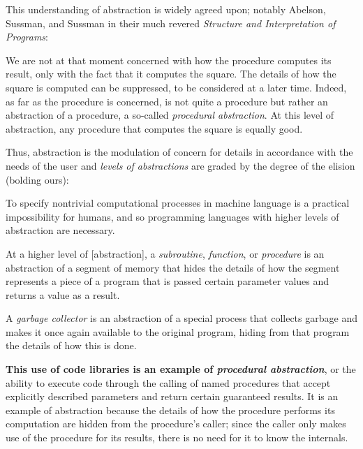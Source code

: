 This understanding of abstraction is widely agreed upon;
notably Abelson, Sussman, and Sussman in their much revered \textit{Structure and Interpretation of Programs}:
\begin{displayquote}
    We are not at that moment concerned with how the procedure computes its result, only with the fact that it computes the square.
    The details of how the square is computed can be suppressed, to be considered at a later time.
    Indeed, as far as the  procedure is concerned,  is not quite a procedure but rather an abstraction of a procedure, a so-called \textit{procedural abstraction}.
    At this level of abstraction, any procedure that computes the square is equally good.
\end{displayquote}

Thus, abstraction is the modulation of concern for details in accordance with the needs of the user and \textit{levels of abstractions} are graded by the degree of the elision (bolding ours):
\begin{displayquote}
    To specify nontrivial computational processes in machine language is a practical impossibility for humans, and so programming languages with higher levels of abstraction are necessary.

    \vspace{4pt}

    \textellipsis At a higher level of [abstraction], a \textit{subroutine}, \textit{function}, or \textit{procedure} is an abstraction of a segment of memory that hides the details of how the segment represents a piece of a program that is passed certain parameter values and returns a value as a result.

    \vspace{4pt}

    \textellipsis A \textit{garbage collector} is an abstraction of a special process that collects garbage and makes it once again available to the original program, hiding from that program the details of how this is done.


    \vspace{4pt}

    \textellipsis \textbf{This use of code libraries is an example of \textit{procedural abstraction}}, or the ability to execute code through the calling of named procedures that accept explicitly described parameters and return certain guaranteed results.
    It is an example of abstraction because the details of how the procedure performs its computation are hidden from the procedure's caller;
    since the caller only makes use of the procedure for its results, there is no need for it to know the internals.
\end{displayquote}


